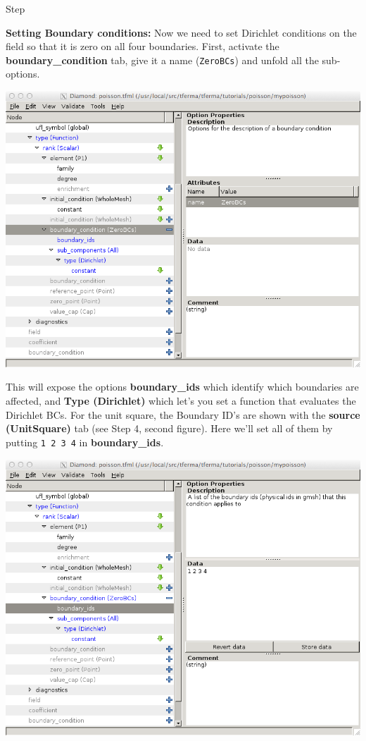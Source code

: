 \begin{steps}{Step}
\begin{center}
\end{center}
\item \textbf{Setting Boundary conditions:} Now we need to set
  Dirichlet conditions on the field so that it is zero on all four
  boundaries. First, activate the \textbf{boundary\_condition} tab,
  give it a name (\texttt{ZeroBCs}) and
  unfold all the sub-options. 
\begin{center}
    \includegraphics[width=\diamondwidth]{figures/screendumps/diamond_poisson_08b.png}
\end{center}
This will expose the options \textbf{boundary\_ids} which identify
which boundaries are affected, and \textbf{Type (Dirichlet)} which
let's you set a function that evaluates the Dirichlet BCs.  For the
unit square,  the Boundary ID's are shown with the \textbf{source
  (UnitSquare)} tab (see Step 4, second figure).  Here we'll set all
of them by putting \texttt{1 2 3 4} in \textbf{boundary\_ids}.  
\begin{center}
    \includegraphics[width=\diamondwidth]{figures/screendumps/diamond_poisson_08c.png}

\end{center}
\end{steps}
